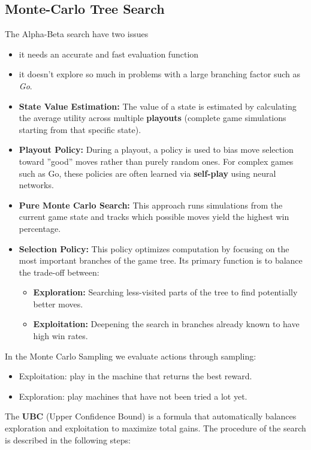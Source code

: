 \documentclass[10pt, letterpaper]{report}
\begin{document}
\subsection{Monte-Carlo Tree Search}
The Alpha-Beta search have two issues\begin{itemize}
    \item it needs an accurate and fast evaluation function 
    \item it doesn't explore so much in problems with a large branching factor such as \textit{Go}.
\end{itemize}
\begin{itemize}[leftmargin=*]
    \item \textbf{State Value Estimation:} The value of a state is estimated by calculating the average utility across multiple \textbf{playouts} (complete game simulations starting from that specific state).
    \item \textbf{Playout Policy:} During a playout, a policy is used to bias move selection toward ''good'' moves rather than purely random ones. For complex games such as Go, these policies are often learned via \textbf{self-play} using neural networks.
    \item \textbf{Pure Monte Carlo Search:} This approach runs simulations from the current game state and tracks which possible moves yield the highest win percentage.
    \item \textbf{Selection Policy:} This policy optimizes computation by focusing on the most important branches of the game tree. Its primary function is to balance the trade-off between:
    \begin{itemize}
        \item \textbf{Exploration:} Searching less-visited parts of the tree to find potentially better moves.
        \item \textbf{Exploitation:} Deepening the search in branches already known to have high win rates.
    \end{itemize}
\end{itemize}
In the Monte Carlo Sampling we evaluate actions through sampling:\begin{itemize}
    \item Exploitation: play in the machine that returns the best reward.
    \item Exploration: play machines that have not been tried a lot yet.
\end{itemize}
The \textbf{UBC} (Upper Confidence Bound) is a formula that automatically balances
 exploration and exploitation to maximize total gains. The procedure of the search is described in the following steps:
\end{document}
